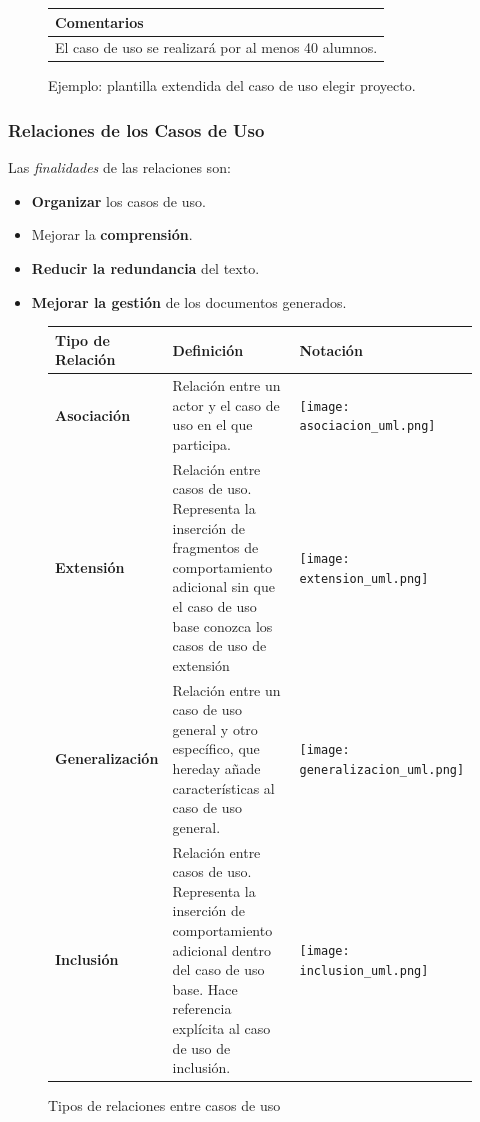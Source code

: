 \documentclass[12pt,spanish]{article}
\begin{document}
\begin{figure}[H]
\vspace{1cm}

\begin{tabular}{|m{16.2cm}|}
\hline
\textbf{Comentarios} \\
\hline
El caso de uso se realizará por al menos 40 alumnos. \\
\hline
\end{tabular}

\caption{Ejemplo: plantilla extendida del caso de uso elegir proyecto.}

\end{figure}

\subsubsection{Relaciones de los Casos de Uso}

Las \emph{finalidades} de las relaciones son:
\begin{itemize}
	\item \textbf{Organizar} los casos de uso.
	\item Mejorar la \textbf{comprensión}.
	\item \textbf{Reducir la redundancia} del texto.
	\item \textbf{Mejorar la gestión} de los documentos generados.
\end{itemize}

\begin{figure}[H]
\centering
\begin{tabular}{|m{3cm}|m{6.5cm}|m{6cm}|}
\hline
\cellcolor{blue!30}Tipo de Relación & \cellcolor{blue!30}Definición & \cellcolor{blue!30}Notación \\
\hline
\textbf{Asociación} & Relación entre un actor y el caso de uso en el que participa. &
\begin{center}
\texttt{[image: asociacion\_uml.png]}
\end{center} \\
\hline
\textbf{Extensión} & Relación entre casos de uso. Representa la inserción de fragmentos de comportamiento adicional sin que el caso de uso base conozca los casos de uso de extensión &
\begin{center}
\texttt{[image: extension\_uml.png]}
\end{center} \\
\hline
\textbf{Generalización} & Relación entre un caso de uso general y otro específico, que hereday añade características al caso de uso general. &
\begin{center}
\texttt{[image: generalizacion\_uml.png]}
\end{center} \\
\hline
\textbf{Inclusión} & Relación entre casos de uso. Representa la inserción de comportamiento adicional dentro del caso de uso base. Hace referencia explícita al caso de uso de inclusión. & 
\begin{center}
\texttt{[image: inclusion\_uml.png]}
\end{center}\\
\hline
\end{tabular}
\caption{Tipos de relaciones entre casos de uso}
\end{figure}
\end{document}
